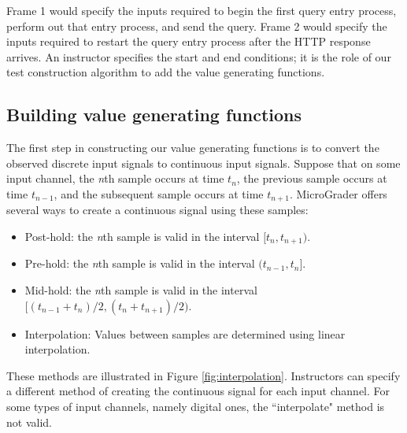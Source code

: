 \documentclass[12pt]{article}
\begin{document}
Frame 1 would specify the inputs required to begin the first query entry process, perform out that entry process, and send the query.  Frame 2 would specify the inputs required to restart the query entry process after the HTTP response arrives.  An instructor specifies the start and end conditions; it is the role of our test construction algorithm to add the value generating functions.

\subsection{Building value generating functions}
The first step in constructing our value generating functions is to convert the observed discrete input signals to continuous input signals.  Suppose that on some input channel, the \textit{n}th sample occurs at time $t_n$, the previous sample occurs at time $t_{n-1}$, and the subsequent sample occurs at time $t_{n+1}$.  MicroGrader offers several ways to create a continuous signal using these samples:

\begin{itemize}
\item Post-hold: the \textit{n}th sample is valid in the interval $[t_n, t_{n+1})$.
\item Pre-hold: the \textit{n}th sample is valid in the interval $(t_{n-1}, t_n]$.
\item Mid-hold: the \textit{n}th sample is valid in the interval $[(t_{n-1} + t_n)/2, (t_n + t_{n+1})/2)$.
\item Interpolation: Values between samples are determined using linear interpolation. 
\end{itemize}

These methods are illustrated in Figure \ref{fig:interpolation}.  Instructors can specify a different method of creating the continuous signal for each input channel.  For some types of input channels, namely digital ones, the ``interpolate" method is not valid.
\end{document}
